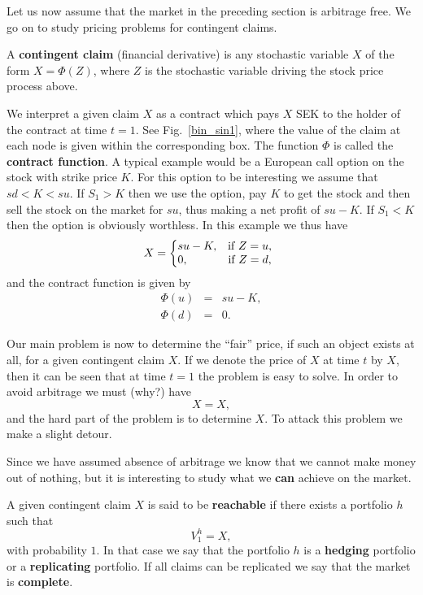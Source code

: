 \documentclass{Base}
\begin{document}
Let us now assume that the market in the preceding section is arbitrage
free. We go on to study pricing problems for contingent claims.

\begin{definition}
A {\bf contingent claim}
(financial derivative)
is any stochastic variable $X$ of the form $X=\Phi (Z)$, where $Z$ is the stochastic variable driving the
stock price process above. \end{definition}

We interpret a given claim $X$ as a contract which pays $X$ SEK to the
holder of the contract at time $t=1$. See Fig.~\ref{bin_sin1}, where
the value of the claim at each node is given within the corresponding box.
The function $\Phi$ is called the
{\bf contract function}. A typical example would be a European call option
on the stock with strike price $K$. For this option to be interesting we
assume that $sd <K<su$. If $S_1 >K$ then we use the option, pay $K$ to get
the stock and then sell the stock on the market for $su$, thus making a net
profit of $su-K$. If $S_1<K$ then the option is obviously worthless. In this
example we thus have
\begin{equation*}
X=\left\{\begin{array}{@{}l@{}c}
su-K, &\quad\mbox{if $Z=u$},\\
0, &\quad \mbox{if $Z=d$},
\end{array}
\right.
\end{equation*}
and the contract function is given by
\begin{eqnarray}
\Phi(u)&=&su-K,\\
\Phi(d)&=&0.
\end{eqnarray}

Our main problem is now to determine the ``fair'' price, if such an object
exists at all, for a given contingent claim $X$. If we denote the price of $X$ at time $t$ by $X$, then it can be seen that at time $t=1$ the
problem is easy to solve. In order to avoid arbitrage we must (why?) have
\begin{equation*}
X=X,
\end{equation*}
and the hard part of the problem is to determine $X$. To attack
this problem we make a slight detour.

Since we have assumed absence of arbitrage we know that we cannot make
money out of nothing, but it is interesting to study what we {\bf can}
achieve on the market.

\begin{definition}
A given contingent claim $X$ is said to be {\bf reachable}
if there exists a
portfolio $h$ such that
\begin{equation*}
V_1^h=X,
\end{equation*}
with probability $1$. In that case we say that the portfolio $h$ is a
{\bf hedging} portfolio or a
{\bf replicating} portfolio. If all claims can be
replicated we say that the market is {\bf complete}. \end{definition}
\end{document}
